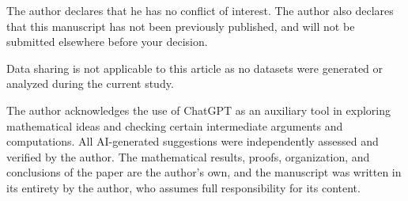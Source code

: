 \documentclass[11pt,reqno]{amsart}
\numberwithin{equation}{section}
\begin{document}
\vspace{0.4 cm}

 The author declares that he has no conflict of interest.
The author also declares that this manuscript has not been previously published,
and will not be submitted elsewhere before your decision.

\bigskip
{} Data sharing is not applicable to this article as no datasets were generated or analyzed during the current study.

\bigskip

 The author acknowledges the use of ChatGPT as an auxiliary tool in exploring mathematical ideas and checking certain intermediate arguments and computations. All AI-generated suggestions were independently assessed and verified by the author. The mathematical results, proofs, organization, and conclusions of the paper are the author’s own, and the manuscript was written in its entirety by the author, who assumes full responsibility for its content.


\end{document}
